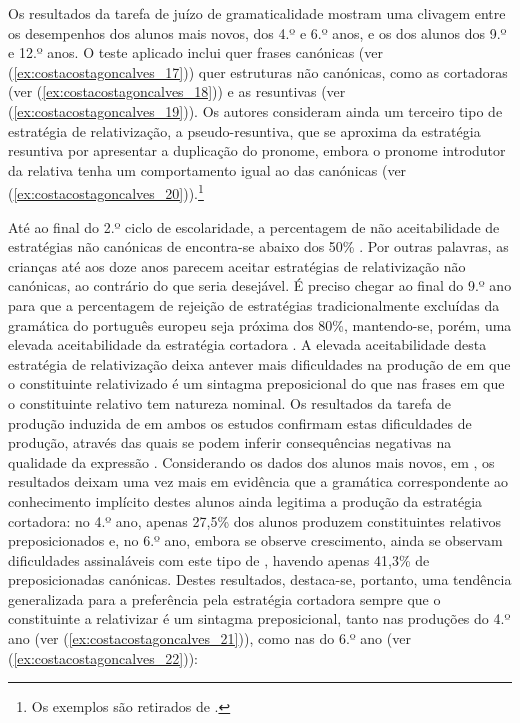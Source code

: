 \documentclass[output=paper]{LSP/langsci}
\begin{document}
Os resultados da tarefa de juízo de gramaticalidade mostram uma clivagem entre os desempenhos dos alunos mais novos, dos 4.º e 6.º anos, e os dos alunos dos 9.º e 12.º anos. O teste aplicado inclui quer frases  canónicas (ver (\ref{ex:costacostagoncalves_17})) quer estruturas não canónicas, como as cortadoras (ver (\ref{ex:costacostagoncalves_18})) e as resuntivas (ver (\ref{ex:costacostagoncalves_19})). Os autores consideram ainda um terceiro tipo de estratégia de relativização, a pseudo-resuntiva, que se aproxima da estratégia resuntiva por apresentar a duplicação do pronome, embora o pronome introdutor da relativa tenha um comportamento igual ao das  canónicas (ver (\ref{ex:costacostagoncalves_20})).\footnote{Os exemplos são retirados de \citet{fontes2008}.}

\z
{}\z
{}\z
{}\z

Até ao final do 2.º ciclo de escolaridade, a percentagem de não aceitabilidade de estratégias não canónicas de  encontra-se abaixo dos 50\% \citep[156]{fontes2008}. Por outras palavras, as crianças até aos doze anos parecem aceitar estratégias de relativização não canónicas, ao contrário do que seria desejável. É preciso chegar ao final do 9.º ano para que a percentagem de rejeição de estratégias tradicionalmente excluídas da gramática do português europeu seja próxima dos 80\%, mantendo-se, porém, uma elevada aceitabilidade da estratégia cortadora \citep[81]{valente2008}. A elevada aceitabilidade desta estratégia de relativização deixa antever mais dificuldades na produção de  em que o constituinte relativizado é um sintagma preposicional do que nas frases em que o constituinte relativo tem natureza nominal. Os resultados da tarefa de produção induzida de  em ambos os estudos confirmam estas dificuldades de produção, através das quais se podem inferir consequências negativas na qualidade da expressão . Considerando os dados dos alunos mais novos, em \citet[159]{fontes2008}, os resultados deixam uma vez mais em evidência que a gramática correspondente ao conhecimento implícito destes alunos ainda legitima a produção  da estratégia cortadora: no 4.º ano, apenas 27,5\% dos alunos produzem constituintes relativos preposicionados e, no 6.º ano, embora se observe crescimento, ainda se observam dificuldades assinaláveis com este tipo de , havendo apenas 41,3\% de  preposicionadas canónicas. Destes resultados, destaca-se, portanto, uma tendência generalizada para a preferência pela estratégia cortadora sempre que o constituinte a relativizar é um sintagma preposicional, tanto nas produções do 4.º ano (ver (\ref{ex:costacostagoncalves_21})), como nas do 6.º ano (ver (\ref{ex:costacostagoncalves_22})):
\end{document}
